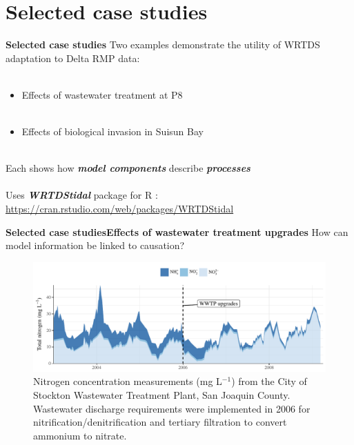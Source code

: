 \documentclass[serif]{beamer}\usepackage[]{graphicx}\usepackage[]{color}
\newcommand{\emtxt}[1]{\textbf{\textit{#1}}}
\begin{document}
\section{Selected case studies}

\begin{frame}{\textbf{Selected case studies}}{\textbf{}}
\onslide<+->
Two examples demonstrate the utility of WRTDS adaptation to Delta RMP data: \\~\\
\begin{itemize}
\item Effects of wastewater treatment at P8 \\~\\
\item Effects of biological invasion in Suisun Bay\\~\\
\end{itemize}
\onslide<+->
Each shows how \emtxt{model components} describe \emtxt{processes} \\~\\
Uses \emtxt{WRTDStidal} package for R \cite{Beck17b}: \href{https://cran.rstudio.com/web/packages/WRTDStidal/index.html}{\url{https://cran.rstudio.com/web/packages/WRTDStidal}}
\end{frame}



\begin{frame}{\textbf{Selected case studies}}{\textbf{Effects of wastewater treatment upgrades}}
How can model information be linked to causation?
\vspace{0.1in}
\begin{figure}
\centerline{\includegraphics[width = \textwidth]{fig/stock.pdf}}
\caption{Nitrogen concentration measurements (mg L$^{-1}$) from the City of Stockton Wastewater Treatment Plant, San Joaquin County.  Wastewater discharge requirements were implemented in 2006 for nitrification/denitrification and tertiary filtration to convert ammonium to nitrate.}
\end{figure}
\end{frame}
\end{document}
